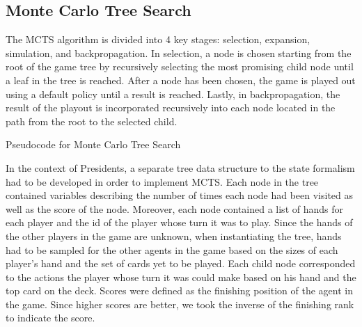 \documentclass[11pt]{article}
\begin{document}
\subsection{Monte Carlo Tree Search}

The MCTS algorithm is divided into 4 key stages: selection, expansion, simulation, and backpropagation. In selection, a node is chosen starting from the root of the game tree by recursively selecting the most promising child node until a leaf in the tree is reached. After a node has been chosen, the game is played out using a default policy until a result is reached. Lastly, in backpropagation, the result of the playout is incorporated recursively into each node located in the path from the root to the selected child.

\begin{algorithm}
  \begin{algorithmic}
	\EndWhile{}
  \end{algorithmic}
  \caption{Pseudocode for Monte Carlo Tree Search}
\end{algorithm}

In the context of Presidents, a separate tree data structure to the state formalism had to be developed in order to implement MCTS. Each node in the tree contained variables describing the number of times each node had been visited as well as the score of the node. Moreover, each node contained a list of hands for each player and the id of the player whose turn it was to play. Since the hands of the other players in the game are unknown, when instantiating the tree, hands had to be sampled for the other agents in the game based on the sizes of each player's hand and the set of cards yet to be played. Each child node corresponded to the actions the player whose turn it was could make based on his hand and the top card on the deck. Scores were defined as the finishing position of the agent in the game. Since higher scores are better, we took the inverse of the finishing rank to indicate the score. 
\end{document}
